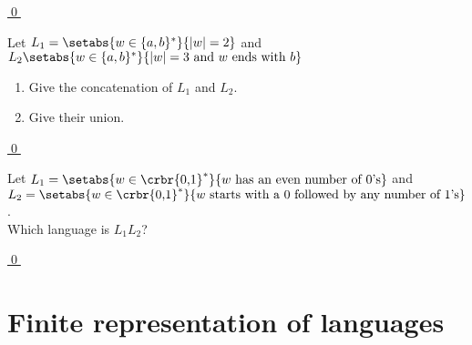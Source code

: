 \documentclass[11pt]{article}
\begin{document}
{\begin{uexercise}
\hyperlink{extf1sol}{\qed}
\end{uexercise}


\begin{uexercise}\label{exconcuni}
Let $L_1 = \setabs{w \in \{ a,b\}^*}{|w| = 2}$ and $L_2\setabs{w \in \{ a,b\}^*}{|w| = 3 \text{ and } w \text{ ends with } b}$

\begin{enumerate}
\item\label{exconcunia} Give the concatenation of $L_1$ and $L_2$.
\item\label{exconcunib} Give their union.
\end{enumerate}

\hyperlink{exconcunisol}{\qed}
\end{uexercise}



\begin{uexercise}\label{lang-desc}
Let $L_1=\setabs{w \in \crbr{\text{0,1}}^*}{w \text{ has an even number of
0's}}$ and  \\
$L_2= \setabs{w \in \crbr{\text{0,1}}^*}{w \text{ starts
with a 0 followed by any number of 1's}}$. \\ Which language is $L_1L_2$?

\hyperlink{lang-desc-sol}{\qed}
\end{uexercise}
\hrulefill

}

\section{Finite representation of languages}
\end{document}

